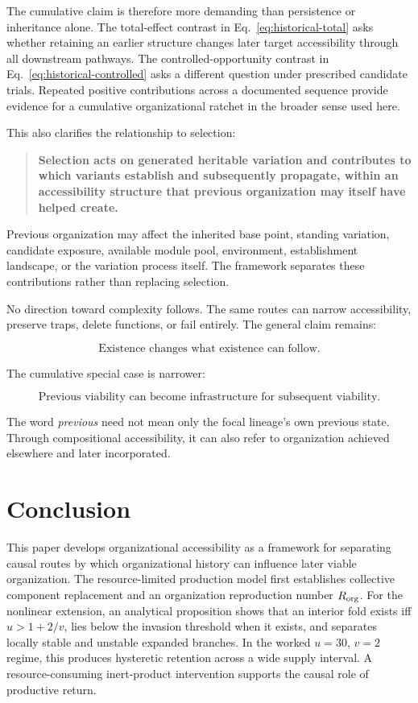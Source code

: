 \documentclass[11pt,a4paper]{article}
\begin{document}
The cumulative claim is therefore more demanding than persistence or inheritance alone. The total-effect contrast in Eq.~\eqref{eq:historical-total} asks whether retaining an earlier structure changes later target accessibility through all downstream pathways. The controlled-opportunity contrast in Eq.~\eqref{eq:historical-controlled} asks a different question under prescribed candidate trials. Repeated positive contributions across a documented sequence provide evidence for a cumulative organizational ratchet in the broader sense used here.

This also clarifies the relationship to selection:

\begin{quote}
\textbf{Selection acts on generated heritable variation and contributes to which variants establish and subsequently propagate, within an accessibility structure that previous organization may itself have helped create.}
\end{quote}

Previous organization may affect the inherited base point, standing variation, candidate exposure, available module pool, environment, establishment landscape, or the variation process itself. The framework separates these contributions rather than replacing selection.

No direction toward complexity follows. The same routes can narrow accessibility, preserve traps, delete functions, or fail entirely. The general claim remains:

\[
\boxed{\text{Existence changes what existence can follow.}}
\]

The cumulative special case is narrower:

\[
\boxed{\text{Previous viability can become infrastructure for subsequent viability.}}
\]

The word \emph{previous} need not mean only the focal lineage's own previous state. Through compositional accessibility, it can also refer to organization achieved elsewhere and later incorporated.

\section{Conclusion}

This paper develops organizational accessibility as a framework for separating causal routes by which organizational history can influence later viable organization. The resource-limited production model first establishes collective component replacement and an organization reproduction number $R_{\rm org}$. For the nonlinear extension, an analytical proposition shows that an interior fold exists iff $u>1+2/v$, lies below the invasion threshold when it exists, and separates locally stable and unstable expanded branches. In the worked $u=30$, $v=2$ regime, this produces hysteretic retention across a wide supply interval. A resource-consuming inert-product intervention supports the causal role of productive return.
\end{document}
